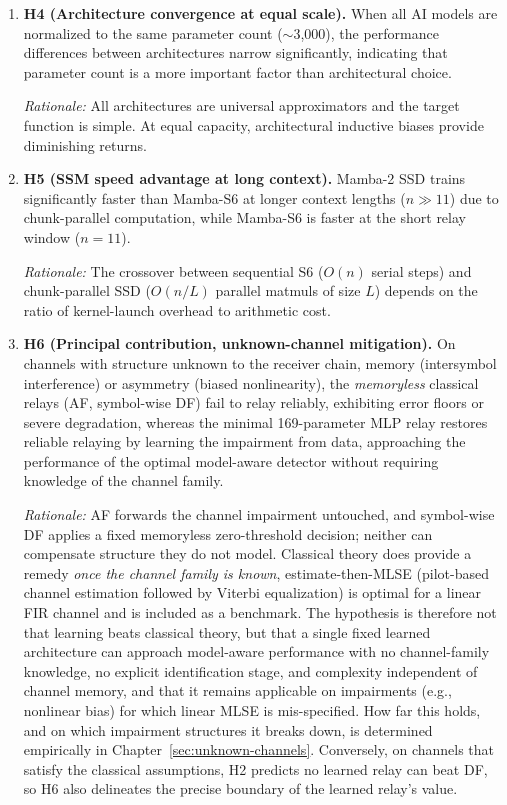 \begin{enumerate}
\emph{Rationale:} The bias-variance analysis (Section \ref{sec:theoretical-basis-universal-approximation-and-denoising}) predicts that the low-complexity target function $f^*$ requires minimal model capacity. Excess capacity increases variance without reducing bias.

\item \textbf{H4 (Architecture convergence at equal scale).} When all AI models are normalized to the same parameter count ($\sim$3,000), the performance differences between architectures narrow significantly, indicating that parameter count is a more important factor than architectural choice.

\emph{Rationale:} All architectures are universal approximators and the target function is simple. At equal capacity, architectural inductive biases provide diminishing returns.

\item \textbf{H5 (SSM speed advantage at long context).} Mamba-2 SSD trains significantly faster than Mamba-S6 at longer context lengths ($n \gg 11$) due to chunk-parallel computation, while Mamba-S6 is faster at the short relay window ($n = 11$).

\emph{Rationale:} The crossover between sequential S6 ($O(n)$ serial steps) and chunk-parallel SSD ($O(n/L)$ parallel matmuls of size $L$) depends on the ratio of kernel-launch overhead to arithmetic cost.


\item \textbf{H6 (Principal contribution, unknown-channel mitigation).} On channels with structure unknown to the receiver chain, memory (intersymbol interference) or asymmetry (biased nonlinearity), the \emph{memoryless} classical relays (AF, symbol-wise DF) fail to relay reliably, exhibiting error floors or severe degradation, whereas the minimal 169-parameter MLP relay restores reliable relaying by learning the impairment from data, approaching the performance of the optimal model-aware detector without requiring knowledge of the channel family.

\emph{Rationale:} AF forwards the channel impairment untouched, and symbol-wise DF applies a fixed memoryless zero-threshold decision; neither can compensate structure they do not model. Classical theory does provide a remedy \emph{once the channel family is known}, estimate-then-MLSE (pilot-based channel estimation followed by Viterbi equalization) is optimal for a linear FIR channel and is included as a benchmark. The hypothesis is therefore not that learning beats classical theory, but that a single fixed learned architecture can approach model-aware performance with no channel-family knowledge, no explicit identification stage, and complexity independent of channel memory, and that it remains applicable on impairments (e.g., nonlinear bias) for which linear MLSE is mis-specified. How far this holds, and on which impairment structures it breaks down, is determined empirically in Chapter~\ref{sec:unknown-channels}. Conversely, on channels that satisfy the classical assumptions, H2 predicts no learned relay can beat DF, so H6 also delineates the precise boundary of the learned relay's value.
\end{enumerate}

